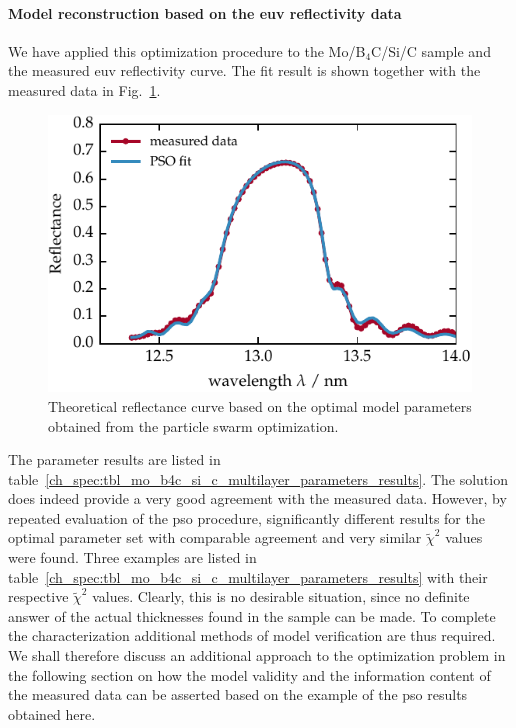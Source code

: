 \paragraph{Model reconstruction based on the \gls{euv} reflectivity data}
We have applied this optimization procedure to the Mo/B$_4$C/Si/C sample and the measured \gls{euv} reflectivity curve. The fit result is shown together with the measured data in Fig.~\ref{ch_spec:fig_ptb17_reflectance_AOI_15_fitted}.
\begin{figure}[htbp]
\centering
\includegraphics{img/PTB17_reflectance_AOI_15_fitted}
\caption{Theoretical reflectance curve based on the optimal model parameters obtained from the particle swarm optimization.}
\label{ch_spec:fig_ptb17_reflectance_AOI_15_fitted}
\end{figure}
The parameter results are listed in table~\ref{ch_spec:tbl_mo_b4c_si_c_multilayer_parameters_results}. The solution does indeed provide a very good agreement with the measured data. However, by repeated evaluation of the \gls{pso} procedure, significantly different results for the optimal parameter set with comparable agreement and very similar $\tilde{\chi}^2$ values were found. Three examples are listed in table~\ref{ch_spec:tbl_mo_b4c_si_c_multilayer_parameters_results} with their respective $\tilde{\chi}^2$ values. Clearly, this is no desirable situation, since no definite answer of the actual thicknesses found in the sample can be made. To complete the characterization additional methods of model verification are thus required. We shall therefore discuss an additional approach to the optimization problem in the following section on how the model validity and the information content of the measured data can be asserted based on the example of the \gls{pso} results obtained here.
